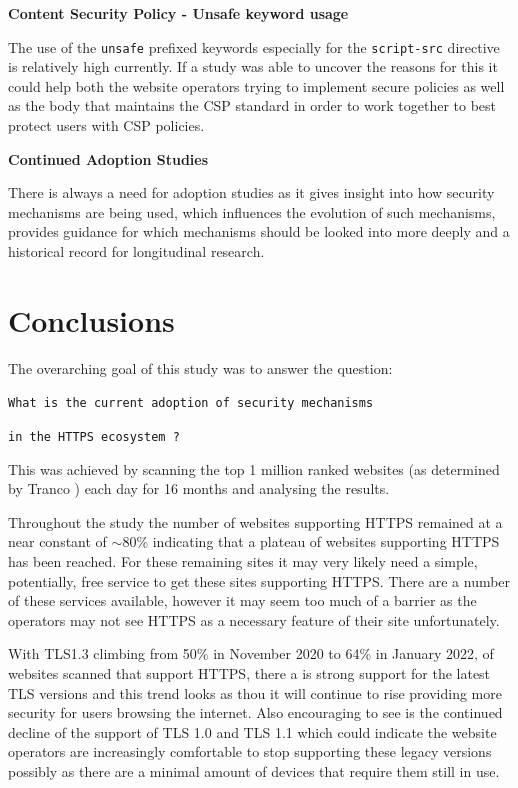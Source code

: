 \documentclass{mscreport}
\begin{document}
\vspace{0.7cm} \noindent
\textbf{Content Security Policy - Unsafe keyword usage}

\noindent
The use of the \texttt{unsafe} prefixed keywords especially for the \texttt{script-src} directive is relatively high currently. If a study was able to uncover the reasons for this it could help both the website operators trying to implement secure policies as well as the body that maintains the CSP standard in order to work together to best protect users with CSP policies.  

\vspace{0.7cm} \noindent
\textbf{Continued Adoption Studies}

\noindent
There is always a need for adoption studies as it gives insight into how security mechanisms are being used, which influences the evolution of such mechanisms, provides guidance for which mechanisms should be looked into more deeply and a historical record for longitudinal research.

\newpage

\section{Conclusions}

\noindent
The overarching goal of this study was to answer the question:

\vspace{0.6cm} \noindent
\centerline{\texttt{What is the current adoption of security mechanisms}}
\centerline{\texttt{in the HTTPS ecosystem ?}}

\vspace{0.3cm} \noindent
This was achieved by scanning the top 1 million ranked websites (as determined by Tranco \cite{noauthor_undated-mt}) each day for 16 months and analysing the results.

\vspace{0.3cm} \noindent
Throughout the study the number of websites supporting HTTPS remained at a near constant of $\sim$80\% indicating that a plateau of websites supporting HTTPS has been reached. For these remaining sites it may very likely need a simple, potentially, free service to get these sites supporting HTTPS. There are a number of these services available, however it may seem too much of a barrier as the operators may not see HTTPS as a necessary feature of their site unfortunately.

\vspace{0.3cm} \noindent
With TLS1.3 climbing from 50\% in November 2020 to 64\% in January 2022, of websites scanned that support HTTPS, there a is strong support for the latest TLS versions and this trend looks as thou it will continue to rise providing more security for users browsing the internet. Also encouraging to see is the continued decline of the support of TLS 1.0 and TLS 1.1 which could indicate the website operators are increasingly comfortable to stop supporting these legacy versions possibly as there are a minimal amount of devices that require them still in use.
\end{document}
